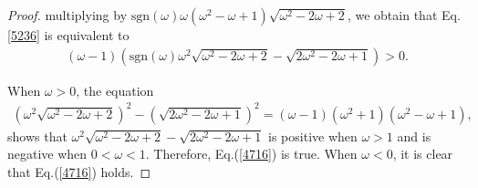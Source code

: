 \documentclass[a4paper,12pt]{article}
\theoremstyle{plain}
\theoremstyle{definition}
\theoremstyle{definition}
\begin{document}
\begin{proof}
multiplying by $\mathrm{sgn}(\omega) \omega(\omega^2 - \omega + 1)\sqrt{\omega^2-2\omega +2}$, we obtain that Eq.\eqref{5236} is equivalent to
\begin{align}
\label{4716}
(\omega-1)(\mathrm{sgn}(\omega)\omega^2 \sqrt{\omega^2-2\omega +2} -\sqrt{2\omega^2-2\omega+1})>0.
\end{align}

When $\omega > 0$, the equation
\begin{align*}
    \left(\omega^2 \sqrt{\omega^2 - 2\omega + 2}\right)^2 - \left(\sqrt{2\omega^2 - 2\omega + 1}\right)^2 =(\omega-1)(\omega^2+1)(\omega^2-\omega+1),
\end{align*}
shows that $\omega^2 \sqrt{\omega^2-2\omega +2} -\sqrt{2\omega^2-2\omega+1}$
is positive when $\omega>1$ and is negative when $0<\omega<1$.
Therefore, Eq.(\ref{4716}) is true.
When $\omega < 0$, it is clear that Eq.(\ref{4716}) holds.



\end{proof}
\end{document}
